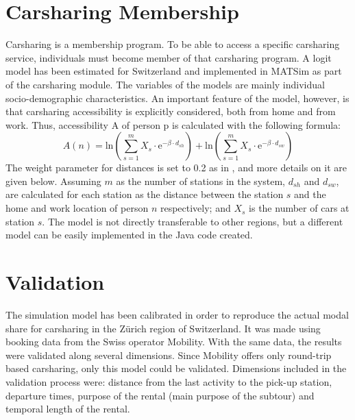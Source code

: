 \section{Carsharing Membership}
Carsharing is a membership program. To be able to access a specific carsharing service, individuals must become member of that carsharing program. A logit model has been estimated for Switzerland \citep[][]{CiariWeis_EURO_2014} and implemented in MATSim as part of the carsharing module. The variables of the models are mainly individual socio-demographic characteristics.  
An important feature of the model, however, is that carsharing accessibility is explicitly considered, both from home and from work. Thus, accessibility A of person p is calculated with the following formula:
%
\begin{equation}
A(n) = \mathrm{ln} \left(\sum_{s=1}^m X_s \cdot \mathrm{e}^{-\beta \cdot d_{sh}}\right) + \mathrm{ln} \left(\sum_{s=1}^{m} X_s \cdot \mathrm{e}^{-\beta \cdot d_{sw}}\right)
\end{equation}
%
The weight parameter for distances is set to 0.2 as in \citet[][]{Weis_PhDThesis_2012}, and more details on it are given below. Assuming $m$ as the number of stations in the system, $d_{sh}$ and $d_{sw}$, are calculated for each station as the distance between the station $s$ and the home and work location of person $n$ respectively; and $X_s$ is the number of cars at station $s$. 
The model is not directly transferable to other regions, but a different model can be easily implemented in the Java code created. 

\section{Validation}
The simulation model has been calibrated in order to reproduce the actual modal share for carsharing in the Zürich region of Switzerland. It was made using booking data from the Swiss operator Mobility. With the same data, the results were validated along several dimensions. Since Mobility  offers only round-trip based carsharing, only this model could be validated. Dimensions included in the validation process were: distance from the last activity to the pick-up station, departure times, purpose of the rental (main purpose of the subtour) and temporal length of the rental. 

